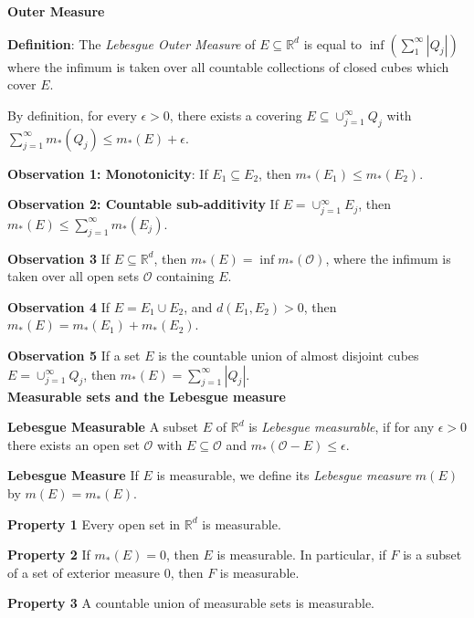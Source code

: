 \documentclass[6pt,landscape]{article}
\begin{document}
\setlength{\parindent}{0pt}
\footnotesize

\newcommand{\norm}[1]{\left\lVert#1\right\rVert}

\begin{multicols*}{3}

\textbf{Outer Measure}

\textbf{Definition}: The \textit{Lebesgue Outer Measure} of $E\subseteq \mathbb{R}^d$ is equal to $\inf(\sum_1^{\infty} |Q_j|)$ where the infimum is taken over all countable collections
of closed cubes which cover $E$.

By definition, for every $\epsilon>0$, there exists a covering $E\subseteq \cup_{j=1}^{\infty} Q_j$ with $\sum_{j=1}^{\infty} m_*(Q_j) \leq m_*(E) + \epsilon$.

\textbf{Observation 1: Monotonicity}: If $E_1\subseteq E_2$, then $m_*(E_1) \leq m_*(E_2)$.

\textbf{Observation 2: Countable sub-additivity} If $E = \cup_{j=1}^{\infty} E_j$, then $m_*(E) \leq \sum_{j=1}^{\infty} m_*(E_j)$.

\textbf{Observation 3} If $E\subseteq\mathbb{R}^d$, then $m_*(E) = \inf m_*(\mathcal{O})$, where the infimum is taken over all open sets $\mathcal{O}$ containing $E$.

\textbf{Observation 4} If $E = E_1\cup E_2$, and $d(E_1,E_2)>0$, then $m_*(E) = m_*(E_1) + m_*(E_2)$.

\textbf{Observation 5} If a set $E$ is the countable union of almost disjoint cubes $E = \cup_{j=1}^{\infty} Q_j$, then $m_*(E) = \sum_{j=1}^{\infty} |Q_j|$.\\

\textbf{Measurable sets and the Lebesgue measure}

\textbf{Lebesgue Measurable} A subset $E$ of $\mathbb{R}^d$ is \textit{Lebesgue measurable}, if for any $\epsilon>0$ there exists an open set $\mathcal{O}$ with $E\subseteq\mathcal{O}$ and $m_*(\mathcal{O}-E)\leq \epsilon$.

\textbf{Lebesgue Measure} If $E$ is measurable, we define its \textit{Lebesgue measure} $m(E)$ by $m(E) = m_*(E)$.

\textbf{Property 1} Every open set in $\mathbb{R}^d$ is measurable.

\textbf{Property 2} If $m_*(E)=0$, then $E$ is measurable. In particular, if $F$ is a subset of a set of exterior measure 0, then $F$ is measurable.

\textbf{Property 3} A countable union of measurable sets is measurable.


\end{multicols*}
\end{document}
